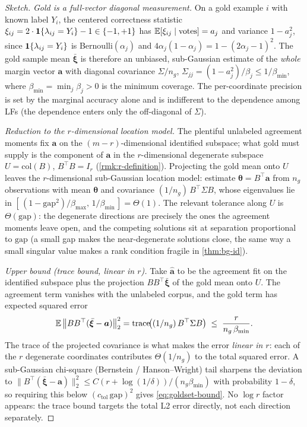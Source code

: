 \begin{proof}[Sketch]
\emph{Gold is a full-vector diagonal measurement.} On a gold example
$i$ with known label $Y_i$, the centered correctness statistic
$\xi_{ij} = 2\cdot\mathbf{1}\{\lambda_{ij} = Y_i\} - 1 \in \{-1, +1\}$ has
$\mathbb{E}[\xi_{ij} \mid \text{votes}] = a_j$ and variance $1 - a_j^2$, since
$\mathbf{1}\{\lambda_{ij} = Y_i\}$ is Bernoulli$(\alpha_j)$ and $4
\alpha_j(1-\alpha_j) = 1 - (2\alpha_j - 1)^2$. The gold sample mean
$\bar{\bm{\xi}}$ is therefore an unbiased, sub-Gaussian estimate of the
\emph{whole} margin vector $\bm{a}$ with diagonal covariance
$\Sigma/n_g$, $\Sigma_{jj} = (1 - a_j^2)/\beta_j \le 1/\beta_{\min}$,
where $\beta_{\min} = \min_j \beta_j > 0$ is the minimum coverage. The
per-coordinate precision is set by the marginal accuracy alone and is
indifferent to the dependence among LFs (the dependence enters only the
off-diagonal of $\Sigma$).

\emph{Reduction to the $r$-dimensional location model.} The plentiful
unlabeled agreement moments fix $\bm{a}$ on the $(m-r)$-dimensional
identified subspace; what gold must supply is the component of $\bm{a}$
in the $r$-dimensional degenerate subspace $U = \mathrm{col}(B)$,
$B^\top B = I_r$ (\cref{rmk:r-definition}). Projecting the gold mean
onto $U$ leaves the $r$-dimensional sub-Gaussian location model:
estimate $\bm\theta = B^\top \bm{a}$ from $n_g$ observations with mean
$\bm\theta$ and covariance $(1/n_g)\, B^\top \Sigma B$, whose
eigenvalues lie in $[\,(1-\mathrm{gap}^2)/\beta_{\max},\,
1/\beta_{\min}\,] = \Theta(1)$. The relevant tolerance along $U$ is
$\Theta(\mathrm{gap})$: the degenerate directions are precisely the
ones the agreement moments leave open, and the competing solutions sit
at separation proportional to $\mathrm{gap}$ (a small gap makes the
near-degenerate solutions close, the same way a small singular value
makes a rank condition fragile in \cref{thm:bg-id}).

\emph{Upper bound (trace bound, linear in $r$).} Take $\hat{\bm{a}}$ to
be the agreement fit on the identified subspace plus the projection $B
B^\top \bar{\bm{\xi}}$ of the gold mean onto $U$. The agreement term
vanishes with the unlabeled corpus, and the gold term has expected
squared error
\begin{equation}
  \mathbb{E}\,\bigl\| B B^\top(\bar{\bm{\xi}} - \bm{a}) \bigr\|_2^2
   = \mathrm{trace}\!\bigl( (1/n_g)\, B^\top \Sigma B \bigr)
   \;\le\; \frac{r}{n_g\, \beta_{\min}}.
  \label{eq:trace-bound}
\end{equation}
The trace of the projected covariance is what makes the error
\emph{linear in $r$}: each of the $r$ degenerate coordinates
contributes $\Theta(1/n_g)$ to the total squared error. A sub-Gaussian
chi-square (Bernstein / Hanson--Wright) tail
\citep{wainwright2019high} sharpens the deviation to
$\|B^\top(\bar{\bm{\xi}} - \bm{a})\|_2^2 \le C(r + \log(1/\delta))/(n_g
\beta_{\min})$ with probability $1 - \delta$, so requiring this below
$(c_{\mathrm{tol}}\,\mathrm{gap})^2$ gives \eqref{eq:goldset-bound}. No $\log r$
factor appears: the trace bound targets the total L2 error directly,
not each direction separately.


\end{proof}
